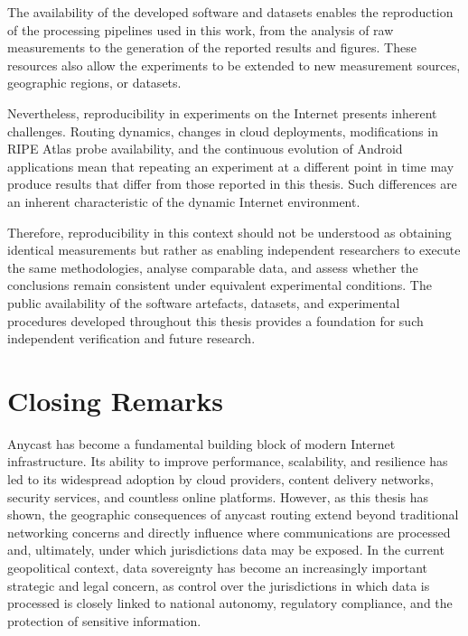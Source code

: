 The availability of the developed software and datasets enables the reproduction of the processing pipelines used in this work, from the analysis of raw measurements to the generation of the reported results and figures. These resources also allow the experiments to be extended to new measurement sources, geographic regions, or datasets.

Nevertheless, reproducibility in experiments on the Internet presents inherent challenges. Routing dynamics, changes in cloud deployments, modifications in RIPE Atlas probe availability, and the continuous evolution of Android applications mean that repeating an experiment at a different point in time may produce results that differ from those reported in this thesis. Such differences are an inherent characteristic of the dynamic Internet environment.

Therefore, reproducibility in this context should not be understood as obtaining identical measurements but rather as enabling independent researchers to execute the same methodologies, analyse comparable data, and assess whether the conclusions remain consistent under equivalent experimental conditions. The public availability of the software artefacts, datasets, and experimental procedures developed throughout this thesis provides a foundation for such independent verification and future research.

\section{Closing Remarks}
\label{sc:conclusion_closing}

Anycast has become a fundamental building block of modern Internet infrastructure. Its ability to improve performance, scalability, and resilience has led to its widespread adoption by cloud providers, content delivery networks, security services, and countless online platforms. However, as this thesis has shown, the geographic consequences of anycast routing extend beyond traditional networking concerns and directly influence where communications are processed and, ultimately, under which jurisdictions data may be exposed. In the current geopolitical context, data sovereignty has become an increasingly important strategic and legal concern, as control over the jurisdictions in which data is processed is closely linked to national autonomy, regulatory compliance, and the protection of sensitive information.

